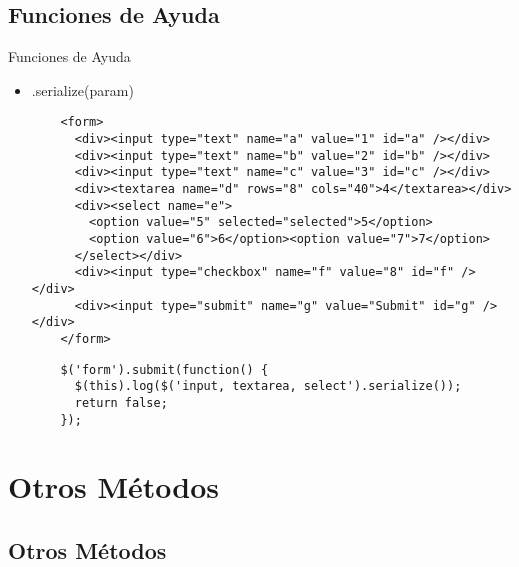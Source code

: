 \subsection{Funciones de Ayuda} %

\begin{frame}[fragile]{Funciones de Ayuda} %
\begin{itemize}
    \item .serialize(param)
    \begin{lstlisting}
    <form>
      <div><input type="text" name="a" value="1" id="a" /></div>
      <div><input type="text" name="b" value="2" id="b" /></div>
      <div><input type="text" name="c" value="3" id="c" /></div>
      <div><textarea name="d" rows="8" cols="40">4</textarea></div>
      <div><select name="e">
        <option value="5" selected="selected">5</option>
        <option value="6">6</option><option value="7">7</option>
      </select></div>
      <div><input type="checkbox" name="f" value="8" id="f" /></div>
      <div><input type="submit" name="g" value="Submit" id="g" /></div>
    </form>
    \end{lstlisting}
    \begin{lstlisting}
    $('form').submit(function() {
      $(this).log($('input, textarea, select').serialize());
      return false;
    });
    \end{lstlisting}
\end{itemize}
\end{frame}

\section{Otros Métodos} %

\subsection{Otros Métodos} %

